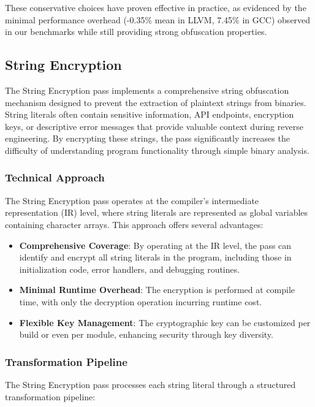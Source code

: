 \documentclass[conference]{IEEEtran}
\begin{document}
These conservative choices have proven effective in practice, as evidenced by the minimal performance overhead (-0.35\% mean in LLVM, 7.45\% in GCC) observed in our benchmarks while still providing strong obfuscation properties.

\subsection{String Encryption}
The String Encryption pass implements a comprehensive string obfuscation mechanism designed to prevent the extraction of plaintext strings from binaries. String literals often contain sensitive information, API endpoints, encryption keys, or descriptive error messages that provide valuable context during reverse engineering. By encrypting these strings, the pass significantly increases the difficulty of understanding program functionality through simple binary analysis.

\subsubsection{Technical Approach}
The String Encryption pass operates at the compiler's intermediate representation (IR) level, where string literals are represented as global variables containing character arrays. This approach offers several advantages:

\begin{itemize}
    \item \textbf{Comprehensive Coverage}: By operating at the IR level, the pass can identify and encrypt all string literals in the program, including those in initialization code, error handlers, and debugging routines.
    
    \item \textbf{Minimal Runtime Overhead}: The encryption is performed at compile time, with only the decryption operation incurring runtime cost.
    
    \item \textbf{Flexible Key Management}: The cryptographic key can be customized per build or even per module, enhancing security through key diversity.
\end{itemize}

\subsubsection{Transformation Pipeline}
The String Encryption pass processes each string literal through a structured transformation pipeline:
\end{document}
